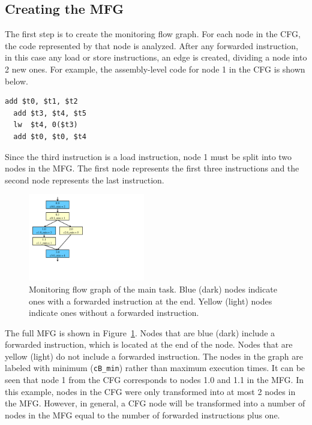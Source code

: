 \subsection{Creating the MFG}

The first step is to create the monitoring flow graph. For each node in the
CFG, the code represented by that node is analyzed. After any forwarded
instruction, in this case any load or store instructions, an edge is created,
dividing a node into 2 new ones.
For example, the assembly-level code for node 1 in the CFG is shown below.
\vspace{-0.2in}
\lstset{numbers=left, 
  firstnumber=1, 
  xleftmargin=2em, 
  numbersep=1em, 
  basicstyle=\ttfamily, 
  title=node 1, 
  } 
\begin{lstlisting}[frame=tb]
  add $t0, $t1, $t2
  add $t3, $t4, $t5
  lw  $t4, 0($t3)
  add $t0, $t0, $t4
\end{lstlisting}
Since the third instruction is a load instruction, node 1 must be split into
two nodes in the MFG. The first node represents the first three instructions and
the second node represents the last instruction. 

\begin{figure}[htb]
  \begin{center}
    \vspace{-0.0in}
    \includegraphics[width=2in]{figs/monitoring_wcet/mfg.pdf}
    \vspace{-0.1in}
    \caption{Monitoring flow graph of the main task. Blue (dark) nodes indicate ones with a forwarded instruction at the end. Yellow (light) nodes indicate ones without a forwarded instruction.}
    \label{fig:app.mfg}
    \vspace{-0.2in}
  \end{center}
\end{figure}

The full MFG is shown in
Figure~\ref{fig:app.mfg}. Nodes that are blue (dark) include a forwarded
instruction, which is located at the end of the node. Nodes that are yellow
(light) do not include a forwarded instruction. The nodes in the graph are
labeled with minimum ({\tt cB\_min}) rather than maximum execution times. It can be seen that
node 1 from the CFG corresponds to nodes 1.0 and 1.1 in the MFG. In this example,
nodes in the CFG were only transformed into at most 2 nodes in the MFG.
However, in general, a CFG node will be transformed into a number of nodes in
the MFG equal to the number of forwarded instructions plus one.

